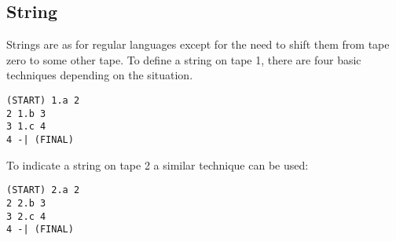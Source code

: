 \subsection{String}
Strings are as for regular languages except for the need to shift them from
tape zero to some other tape.
To define a string on tape 1, there are four basic techniques depending on
the situation.
\begin{center}\begin{minipage}[t]{3in}\begin{minipage}[t]{3in}\end{minipage}\end{minipage}
\begin{minipage}[t]{1.6in}\begin{verbatim}
(START) 1.a 2
2 1.b 3
3 1.c 4
4 -| (FINAL)
\end{verbatim}\end{minipage}\end{center}
To indicate a string on tape 2 a similar technique can be used:
\begin{center}\begin{minipage}[t]{3in}\begin{minipage}[t]{3in}\end{minipage}\end{minipage}
\begin{minipage}[t]{1.6in}\begin{verbatim}
(START) 2.a 2
2 2.b 3
3 2.c 4
4 -| (FINAL)
\end{verbatim}\end{minipage}\end{center}

